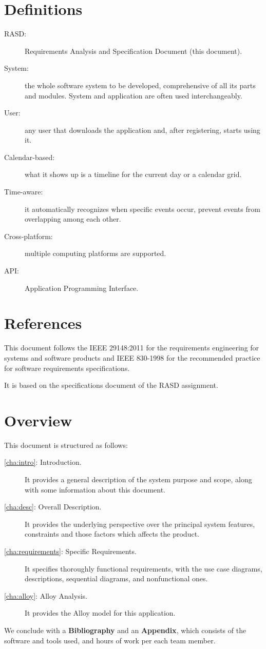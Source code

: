 \section{Definitions}
\label{sec:defs}
\begin{description}
\item[RASD:] Requirements Analysis and Specification Document (this document).
\item[System:] the whole software system to be developed, comprehensive of all its parts and modules. System and application are often used interchangeably. 
\item[User:] any user that downloads the application and, after registering, starts using it.
\item[Calendar-based:] what it shows up is a timeline for the current day or a calendar grid. 
\item[Time-aware:] it automatically recognizes when specific events occur, prevent events from overlapping among each other.
\item[Cross-platform:] multiple computing platforms are supported.
\item[API:] Application Programming Interface.
\end{description}

\section{References}
\label{sec:refer}

This document follows the IEEE 29148:2011\cite{ieee-29148} for the requirements engineering for systems and software products and IEEE 830-1998\cite{ieee-830} for the recommended practice for software requirements specifications.

It is based on the specifications document of the RASD assignment\cite{assignment}.

\section{Overview}
\label{sec:overview}

This document is structured as follows:
\begin{description}
\item[\autoref{cha:intro}: Introduction.] It provides a general description of the system purpose and scope, along with some information about this document.
\item[\autoref{cha:desc}: Overall Description.] It provides the underlying perspective over the principal system features, constraints and those factors which affects the product.
\item[\autoref{cha:requirements}: Specific Requirements.] It specifies thoroughly functional requirements, with the use case diagrams, descriptions, sequential diagrams, and nonfunctional ones.
\item[\autoref{cha:alloy}: Alloy Analysis.] It provides the Alloy\cite{alloy} model for this application.
\end{description}
We conclude with a \textbf{Bibliography} and an \textbf{Appendix}, which consists of the software and tools used, and hours of work per each team member.
